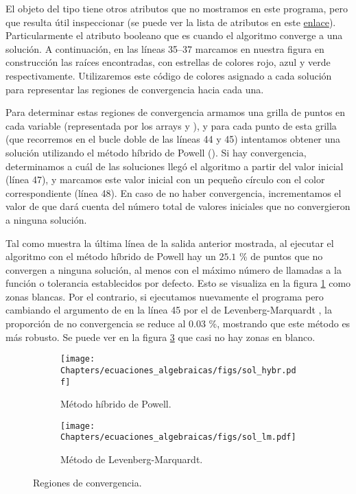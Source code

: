 El objeto  del tipo  tiene otros atributos que no mostramos en este programa, pero que resulta útil inspeccionar (se puede ver la lista de atributos en este \href{https://docs.scipy.org/doc/scipy/reference/generated/scipy.optimize.OptimizeResult.html#scipy.optimize.OptimizeResult}{enlace}). Particularmente el atributo booleano  que es  cuando el algoritmo converge a una solución. A continuación, en las líneas 35--37 marcamos en nuestra figura en construcción las raíces encontradas, con estrellas de colores rojo, azul y verde respectivamente. Utilizaremos este código de colores asignado a cada solución para representar las regiones de convergencia hacia cada una.

Para determinar estas regiones de convergencia armamos una grilla de  puntos en cada variable (representada por los arrays  y ), y para cada punto de esta grilla (que recorremos en el bucle doble de las líneas 44 y 45) intentamos obtener una solución utilizando el método híbrido de Powell (). Si hay convergencia, determinamos a cuál de las soluciones llegó el algoritmo a partir del valor inicial (línea 47), y marcamos este valor inicial con un pequeño círculo con el color correspondiente (línea 48). En caso de no haber convergencia, incrementamos el valor de  que dará cuenta del número total de valores iniciales que no convergieron a ninguna solución.

Tal como muestra la última línea de la salida anterior mostrada, al ejecutar el algoritmo con el método híbrido de Powell hay un $25.1$ \% de puntos que no convergen a ninguna solución, al menos con el máximo número de llamadas a la función o tolerancia establecidos por defecto. Esto se visualiza en la figura \ref{fig:nolin2_hybr} como zonas blancas. Por el contrario, si ejecutamos nuevamente el programa pero cambiando el argumento  de  en la línea 45 por el de Levenberg-Marquardt , la proporción de no convergencia se reduce al $0.03$ \%, mostrando que este método es más robusto. Se puede ver en la figura \ref{fig:nolin2_lm} que casi no hay zonas en blanco.

\begin{figure} 
 \centering
 \begin{subfigure}[b]{0.49\textwidth}
  \texttt{[image: Chapters/ecuaciones\_algebraicas/figs/sol\_hybr.pdf]}
  \caption{Método híbrido de Powell.}
  \label{fig:nolin2_hybr}
 \end{subfigure}
 \begin{subfigure}[b]{0.49\textwidth}
  \texttt{[image: Chapters/ecuaciones\_algebraicas/figs/sol\_lm.pdf]}
  \caption{Método de Levenberg-Marquardt.}
  \label{fig:nolin2_lm}
 \end{subfigure}
 \caption{Regiones de convergencia.}
\end{figure}



